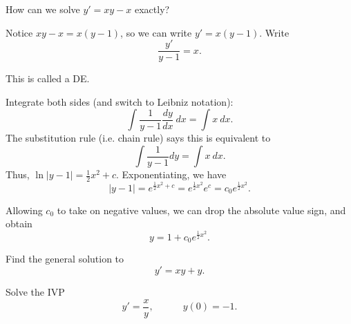 \begin{applicationActivities}
\begin{observation}
\begin{center}\end{center}
\end{observation}

\begin{observation}
How can we solve \(y'=xy-x\) exactly?

\vfill
Notice \(xy-x=x(y-1)\), so we can write  \(y'=x(y-1)\).
\vfill
Write \[\frac{y'}{y-1} = x .\]

This is called a  DE.
\end{observation}

\begin{observation}
Integrate both sides (and switch to Leibniz notation):
\[ \int \frac{1}{y-1} \frac{dy}{dx}\ dx = \int x\ dx .\]
The substitution rule (i.e. chain rule) says this is equivalent to 
\[ \int \frac{1}{y-1} dy = \int x\ dx .\]
Thus, \(\ln|y-1|=\frac{1}{2}x^2+c\).  Exponentiating, we have
\[|y-1|=e^{\frac{1}{2}x^2+c}=e^{\frac{1}{2}x^2}{e^c}=c_0 e^{\frac{1}{2}x^2}.\]

Allowing \(c_0\) to take on negative values, we can drop the absolute value sign, and obtain 
\[y=1+c_0e^{\frac{1}{2}x^2}.\]
\end{observation}

\begin{activity}{10}
Find the general solution to \[y'=xy+y.\]
\end{activity}

\begin{activity}{10}
Solve the IVP \[y'=\frac{x}{y}, \hspace{3em} y(0)=-1.\]
\end{activity}

\end{applicationActivities}
